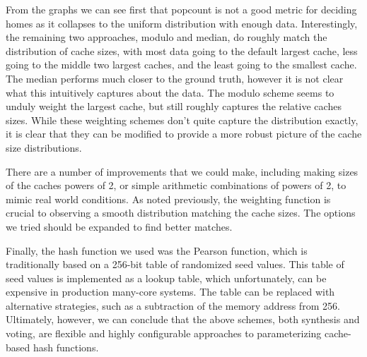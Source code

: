 From the graphs we can see first that popcount is not a good metric for deciding
homes as it collapses to the uniform distribution with enough data.
Interestingly, the remaining two approaches, modulo and median, do roughly match
the distribution of cache sizes, with most data going to the default largest
cache, less going to the middle two largest caches, and the least going to the
smallest cache.  The median performs much closer to the ground truth, however it
is not clear what this intuitively captures about the data.  The modulo scheme
seems to unduly weight the largest cache, but still roughly captures the
relative caches sizes.  While these weighting schemes don't quite capture the
distribution exactly, it is clear that they can be modified to provide a more
robust picture of the cache size distributions.

There are a number of improvements that we could make, including making sizes of
the caches powers of 2, or simple arithmetic combinations of powers of 2, to
mimic real world conditions. As noted previously, the weighting function is
crucial to observing a smooth distribution matching the cache sizes.  The
options we tried should be expanded to find better matches.

Finally, the hash function we used was the Pearson function, which is
traditionally based on a 256-bit table of randomized seed values.  This table of
seed values is implemented as a lookup table, which unfortunately, can be
expensive in production many-core systems.  The table can be replaced with
alternative strategies, such as a subtraction of the memory address from
256. Ultimately, however, we can conclude that the above schemes, both synthesis
and voting, are flexible and highly configurable approaches to parameterizing
cache-based hash functions.

